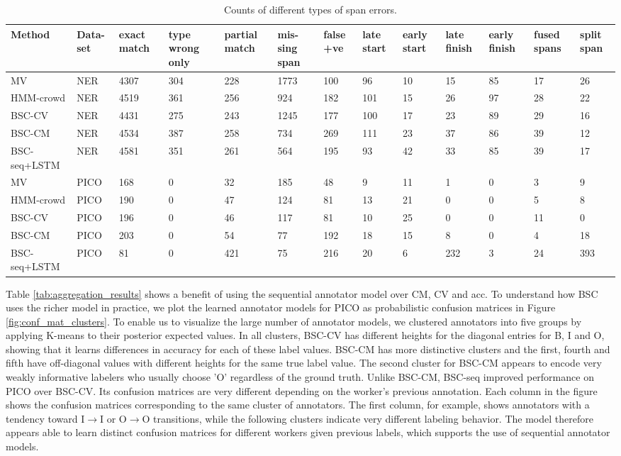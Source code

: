 \begin{table}
\small
\begin{tabularx}{\textwidth}{| l | X | X | X | X | X | X | X | X | X | X | X | X |}
\hline
Method & Data-set & exact match & type wrong only & partial match & mis-sing span & false +ve & late start & early start & late finish & early finish & fused spans & split span \\ \hline
MV & NER & 4307 & 304 & 228 & 1773 & 100 & 96 & 10 & 15 & 85 & 17 & 26 \\
HMM-crowd & NER & 4519 & 361 & 256 & 924 & 182 & 101 & 15 & 26 & 97 & 28 & 22 \\
BSC-CV & NER & 4431 & 275 & 243 & 1245 & 177 & 100 & 17 & 23 & 89 & 29 & 16 \\
BSC-CM & NER & 4534 & 387 & 258 & 734 & 269 & 111 & 23 & 37 & 86 & 39 & 12 \\
BSC-seq+LSTM & NER & 4581 & 351 & 261 & 564 & 195 & 93 & 42 & 33 & 85 & 39 & 17 \\
\hline
MV & PICO    & 168 & 0 & 32 & 185 & 48 & 9 & 11 & 1 & 0 & 3 & 9 \\
HMM-crowd    & PICO & 190 & 0 & 47 & 124 & 81 & 13 & 21 & 0 & 0 & 5 & 8 \\
BSC-CV       & PICO & 196 & 0 & 46 & 117 & 81 & 10 & 25 & 0 & 0 & 11 & 0 \\
BSC-CM       & PICO & 203 & 0 & 54 & 77 & 192 & 18 & 15 & 8 & 0 & 4 & 18 \\
BSC-seq+LSTM & PICO & 81 & 0 & 421 & 75 & 216 & 20 & 6 & 232 & 3 & 24 & 393 \\
\hline
\end{tabularx}
\caption{Counts of different types of span errors.}
\label{tab:error_analysis}
\end{table}
Table \ref{tab:aggregation_results} shows a benefit of using the sequential annotator model over CM, CV and acc.
To understand how BSC uses the richer model in practice, we plot the learned
 annotator models for
PICO as probabilistic confusion matrices in Figure \ref{fig:conf_mat_clusters}.
To enable us to visualize the large number of annotator models, we clustered 
annotators into five groups by applying K-means to their posterior expected values.
In all clusters, BSC-CV has different heights for the diagonal entries for  B, I and O,
showing that it learns differences in accuracy for each of these label values.
BSC-CM has more distinctive clusters and the first, fourth and fifth  
have off-diagonal values with different heights for the same true label value. The second 
cluster for BSC-CM appears to encode very weakly informative labelers who usually choose 'O' regardless of the 
ground truth. 
Unlike BSC-CM, BSC-seq improved performance on PICO over BSC-CV. Its confusion matrices are
very different depending on the worker's previous annotation. 
Each column in the figure shows the confusion matrices corresponding to the same cluster of annotators. 
The first column, for example, shows
annotators with a tendency toward I$\rightarrow$I or O$\rightarrow$O transitions, while the following clusters 
indicate very different labeling behavior. The model therefore appears able to learn
distinct confusion matrices for different workers given previous labels, which supports the use of sequential
annotator models.

